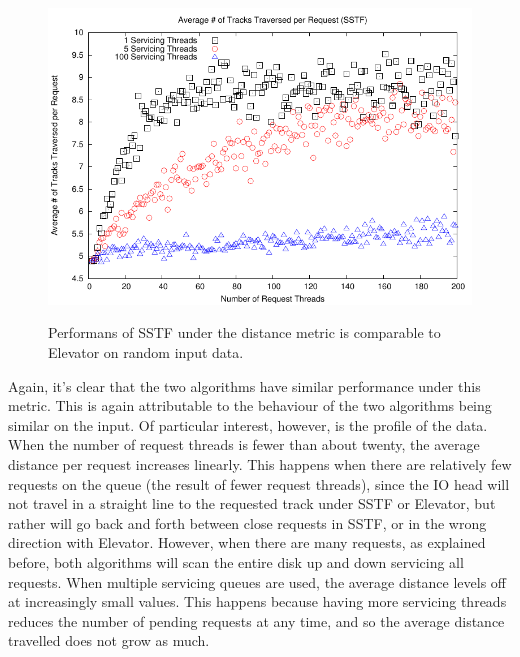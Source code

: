 \documentclass{report}
\begin{document}
\begin{figure}[htb!]
    \centering
    \includegraphics[scale=1]{distanceSSTF.pdf}
    \label{fig:distanceSSTF}
    \caption{Performans of SSTF under the distance metric is comparable to Elevator on
    random input data.}
\end{figure}
\newpage
Again, it's clear that the two algorithms have similar performance under this metric. This
is again attributable to the behaviour of the two algorithms being similar on the input.
Of particular interest, however, is the profile of the data. When the number of request
threads is fewer than about twenty, the average distance per request increases linearly.
This happens when there are relatively few requests on the queue
(the result of fewer request threads), since the IO head will not travel in a straight line to
the requested track under SSTF or Elevator, but rather will go back and forth between
close requests in SSTF, or in the wrong direction with Elevator. However, when there are
many requests, as explained before, both algorithms will scan the entire disk up and down
servicing all requests. When multiple servicing queues are used, the average distance 
levels off at increasingly
small values. This happens because having more servicing threads reduces the number of
pending requests at any time, and so the average distance travelled does not grow as
much.
\end{document}
